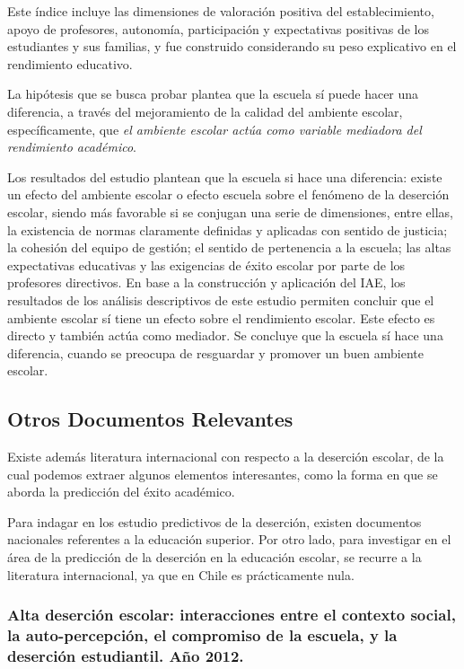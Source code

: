 Este índice incluye las dimensiones de valoración positiva del establecimiento, apoyo de profesores, autonomía, participación y expectativas positivas de los estudiantes y sus familias, y fue construido considerando su peso explicativo en el rendimiento educativo.

La hipótesis que se busca probar plantea que la escuela sí puede hacer una diferencia, a través del mejoramiento de la calidad del ambiente escolar, específicamente, que \textit{el ambiente escolar actúa como variable mediadora del rendimiento académico}. 

Los resultados del estudio plantean que la escuela si hace una diferencia: existe un efecto del ambiente escolar o efecto escuela sobre el fenómeno de la deserción escolar, siendo más favorable si se conjugan una serie de dimensiones, entre ellas, la existencia de normas claramente definidas y aplicadas con sentido de justicia; la cohesión del equipo de gestión; el sentido de pertenencia a la escuela; las altas expectativas educativas y las exigencias de éxito escolar por parte de los profesores directivos. En base a la construcción y aplicación del IAE, los resultados de los análisis descriptivos de este estudio permiten concluir que el ambiente escolar sí tiene un efecto sobre el rendimiento escolar. Este efecto es directo y también actúa como mediador. Se concluye que la escuela sí hace una diferencia, cuando se preocupa de resguardar y promover un buen ambiente escolar. 

\subsection{Otros Documentos Relevantes}
Existe además literatura internacional con respecto a la deserción escolar, de la cual podemos extraer algunos elementos interesantes, como la forma en que se aborda la predicción del éxito académico. 

Para indagar en los estudio predictivos de la deserción, existen documentos nacionales referentes a la educación superior. Por otro lado, para investigar en el área de la predicción de la deserción en la educación escolar, se recurre a la literatura internacional, ya que en Chile es prácticamente nula. 

\subsubsection{Alta deserción escolar: interacciones entre el contexto social, la auto-percepción, el compromiso de la escuela, y la deserción estudiantil. Año 2012.}

